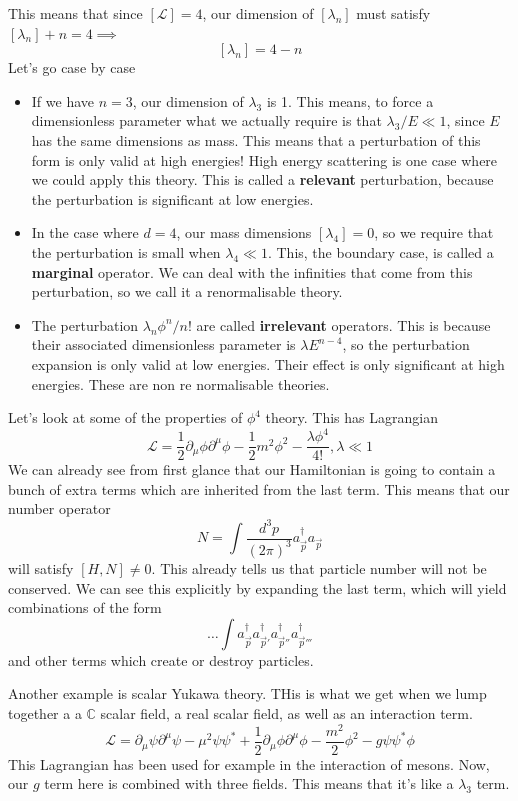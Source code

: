 \documentclass[11pt, oneside]{article}   	%
\theoremstyle{newline}
\theoremstyle{newline}
\theoremstyle{newline}
\theoremstyle{newline}
\theoremstyle{newline}
\begin{document}
This means that since $ [ \mathcal{ L } ]  = 4$, our dimension of $ [ \lambda_ n ] $
must satisfy  $ [ \lambda_n ] + n = 4 \implies $
\[
[ \lambda _ n ] = 4 - n
\] Let's go case by case 
\begin{itemize}
\item  If we have $ n = 3$, our dimension of  $ \lambda_3  $ is 1. 
This means, to force a dimensionless parameter what we actually require is that 
$ \lambda_3 / E  \ll 1 $, since $ E $ has the same dimensions as mass. 
This means that a perturbation of this form is only valid at high energies! 
High energy scattering is one case where we could apply this theory. This is 
called a \textbf{relevant} perturbation, 
because the perturbation is significant at low energies.
\item In the case where $ d = 4$, our mass dimensions $ [ \lambda_4 ]  =0 $, so we 
require that the perturbation is small when $ \lambda_4 \ll 1 $. 
This, the boundary case, is called a \textbf{marginal} operator.
We can deal with the infinities that come from this perturbation, 
so we call it a renormalisable theory. 
\item The perturbation $ \lambda_{ n } \phi^ n / n! $ are called \textbf{irrelevant} 
operators. This is because their associated dimensionless parameter is 
$ \lambda E^{ n - 4}$, so the perturbation expansion is only valid at low energies. 
Their effect is only significant at high energies. These are non re normalisable theories.   
\end{itemize}
Let's look at some of the properties of $ \phi^ 4 $ theory. 
This has Lagrangian 
\[
\mathcal{ L } = \frac{1}{2 } \partial _\mu \phi \partial  ^\mu \phi - \frac{1}{2 } m ^2 \phi ^ 2 - \frac{ \lambda \phi^ 4 }{4 !}, \lambda \ll 1 
\] We can already see from first glance that our Hamiltonian is going to contain 
a bunch of extra terms which are inherited from the last term. 
This means that our number operator 
\[
N = \int \frac{ d^ 3 p }{ ( 2 \pi ) ^ 3 } a_{ \vec{p} }^ \dagger a_{ \vec{p}}
\]  will satisfy $ [ H , N ] \neq 0 $. 
This already tells us that particle number will not be conserved. 
We can see this explicitly by expanding the last term, which will yield combinations
of the form 
\[
\dots \int a^\dagger_{ \vec{p}} a^\dagger_{\vec{p}'} a^\dagger_{\vec{p}''}a^\dagger_{ \vec{p}'''}
\] and other terms which create or destroy particles. 

Another example is scalar Yukawa theory. 
THis is what we get when we lump together a 
a $ \mathbb{ C} $ scalar field, a real scalar field, as well as an interaction term. 
\[
\mathcal{ L } = \partial _\mu\psi \partial ^ \mu \psi - \mu ^ 2 \psi \psi ^ * + \frac{1}{2 } \partial _\mu \phi \partial  ^ \mu \phi - \frac{m^2}{ 2 } \phi ^ 2 - g \psi \psi ^ * \phi  
\] This Lagrangian has been used for example in 
the interaction of mesons.
Now, our $ g $ term here is combined with three fields. 
This means that it's like a $ \lambda _ 3  $ term. 
\end{document}
